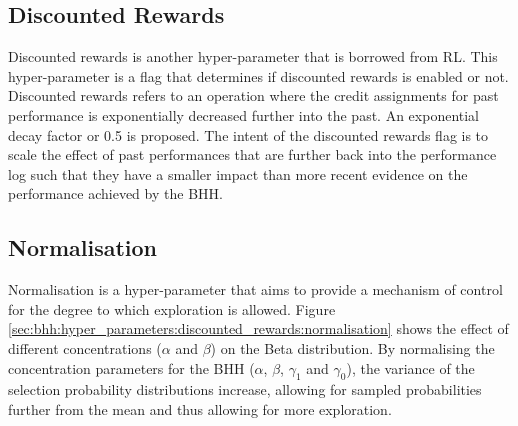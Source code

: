 \subsection{Discounted Rewards}
\label{sec:bhh:hyper_parameters:discounted_rewards}

Discounted rewards is another hyper-parameter that is borrowed from \ac{RL}. This hyper-parameter is a flag that determines if discounted rewards is enabled or not. Discounted rewards refers to an operation where the credit assignments for past performance is exponentially decreased further into the past. An exponential decay factor or 0.5 is proposed. The intent of the discounted rewards flag is to scale the effect of past performances that are further back into the performance log such that they have a smaller impact than more recent evidence on the performance achieved by the \ac{BHH}.

\subsection{Normalisation}
\label{sec:bhh:hyper_parameters:normalisation}

Normalisation is a hyper-parameter that aims to provide a mechanism of control for the degree to which exploration is allowed. Figure \ref{sec:bhh:hyper_parameters:discounted_rewards:normalisation} shows the effect of different concentrations ($\alpha$ and $\beta$) on the Beta distribution. By normalising the concentration parameters for the \ac{BHH} ($\alpha$, $\beta$, $\gamma_{1}$ and $\gamma_{0}$), the variance of the selection probability distributions increase, allowing for sampled probabilities further from the mean and thus allowing for more exploration.


